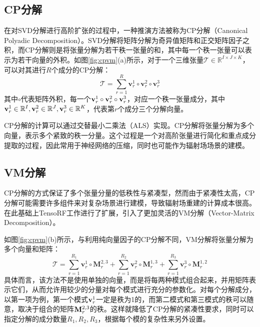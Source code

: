 \documentclass[10pt,twocolumn,letterpaper]{article}
\begin{document}
\subsection{CP分解}
\label{sec:cp}
在对SVD分解进行高阶扩张的过程中，一种推演方法被称为CP分解（Canonical Polyadic Decomposition）\cite{harshman1970cpd}。SVD分解将矩阵分解为奇异值矩阵和正交矩阵因子之积，而CP分解则是将张量分解为若干秩一张量的和，其中每一个秩一张量可以表示为若干向量的外积。如图\ref{fig:cpvm}(a)所示，对于一个三维张量$\mathcal T\in\mathbb R^{I\times J\times K}$，可以对其进行$R$个成分的CP分解：
\begin{equation}
  \mathcal{T}=\sum_{r=1}^{R} \mathbf{v}_{r}^{1} \circ \mathbf{v}_{r}^{2} \circ \mathbf{v}_{r}^{3}
\end{equation}
\label{eq:3}
其中$\circ$代表矩阵外积，每一个$\bold v^1_r\circ\bold v^2_r\circ\bold v^3_r$，对应一个秩一张量成分，其中$\bold v^1_r\in\mathbb R^I,\bold v^2_r\in\mathbb R^J,\bold v^3_r\in\mathbb R^K$，代表第$r$个成分三个分解向量。

CP分解的计算可以通过交替最小二乘法（ALS）实现。CP分解将张量分解为多个向量，表示多个紧致的秩一分量。这个过程是一个对高阶张量进行简化和重点成分提取的过程，因此常用于神经网络的压缩，同时也可能作为辐射场场景的建模。

\subsection{VM分解}
\label{sec:vm}
CP分解的方式保证了多个张量分量的低秩性与紧凑型，然而由于紧凑性太高，CP分解可能需要许多组件来对复杂场景进行建模，导致辐射场重建的计算成本很高。在此基础上TensoRF\cite{chen2022tensorf}工作进行了扩展，引入了更加灵活的VM分解（Vector-Matrix Decomposition）。

如图\ref{fig:cpvm}(b)所示，与利用纯向量因子的CP分解不同，VM分解将张量分解为多个向量和矩阵：
\begin{equation}
  \mathcal{T}=\sum_{r=1}^{R_{1}} \mathbf{v}_{r}^{1} \circ \mathbf{M}_{r}^{2,3}+\sum_{r=1}^{R_{2}} \mathbf{v}_{r}^{2} \circ \mathbf{M}_{r}^{1,3}+\sum_{r=1}^{R_{3}} \mathbf{v}_{r}^{3} \circ \mathbf{M}_{r}^{1,2}
\end{equation}
\label{eq:4}
具体而言，该方法不是使用单独的向量，而是将每两种模式组合起来，并用矩阵表示它们，从而允许用较少的分量对每个模式进行充分的参数化。对每个分解成分，以第一项为例，第一个模式$\bold v^1_r$一定是秩为1的，而第二模式和第三模式的秩可以随意，取决于组合的矩阵$\bold M^{2,3}_r$的秩。这样就降低了CP分解的紧凑性要求，同时可以指定分解的成分数量$R_1,R_2,R_3$，根据每个模的复杂性来另外设置。
\end{document}
